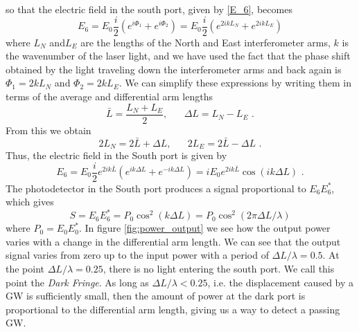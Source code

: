 \documentclass[11pt]{cuthesis}
\newcommand{\fs}{\text{ .}}
\begin{document}
so that the electric field in the south port, given by \ref{E_6}, becomes
\begin{equation}
E_6=E_0 \frac{i}{2} \left( e^{i\Phi_1} + e^{i\Phi_2}  \right)=E_0 \frac{i}{2} \left( e^{2 i k L_N} + e^{2 i k L_E}  \right)
\end{equation}
where $L_N$ and$ L_E$ are the lengths of the North and East interferometer arms, $k$ is the wavenumber of the laser light, and we have used the fact that the phase shift obtained by the light traveling down the interferometer arms and back again is $\Phi_1=2 k L_N$ and $\Phi_2=2 k L_E$. We can simplify these expressions by writing them in terms of the average and differential arm lengths 
\begin{equation}
\bar{L}=\frac{L_N+L_E}{2}, \hspace{20pt} \Delta L =L_N-L_E \fs
\end{equation}
From this we obtain
\begin{equation}
2L_N=2\bar{L}+\Delta L, \hspace{20pt} 2L_E=2\bar{L}-\Delta L \fs 
\end{equation}
Thus, the electric field in the South port is given by
\begin{equation}
E_6=E_0\frac{i}{2}e^{2ik\bar{L}}\left( e^{ik\Delta L} + e^{-ik\Delta L} \right)=iE_0e^{2ik\bar{L}}\cos(ik\Delta L) \fs
\end{equation}
The photodetector in the South port produces a signal proportional to $E_6 E_6^*$, which gives 
\begin{equation}
S=E_6 E_6^*=P_0 \cos^2(k \Delta L)=P_0 \cos^2(2\pi \Delta L / \lambda) 
\end{equation}
where $P_0=E_0 E_0^*$. In figure \ref{fig:power_output} we see how the output power varies with a change in the differential arm length. We can see that the output signal varies from zero up to the input power with a period of $\Delta L/\lambda=0.5$. At the point $\Delta L/\lambda=0.25$, there is no light entering the south port. We call this point the \emph{Dark Fringe}. As long as $\Delta L/\lambda<0.25$, i.e. the displacement caused by a GW is sufficiently small, then the amount of power at the dark port is proportional to the differential arm length, giving us a way to detect a passing GW.
\end{document}
